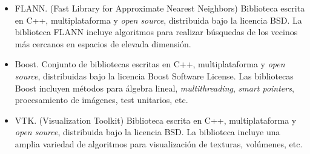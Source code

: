 \begin{itemize}
\item FLANN. (Fast Library for Approximate Nearest Neighbors) Biblioteca escrita en C++, multiplataforma y \textit{open source}, distribuida bajo la licencia BSD. La biblioteca FLANN incluye algoritmos para realizar búsquedas de los vecinos más cercanos en espacios de elevada dimensión.

\item Boost. Conjunto de bibliotecas escritas en C++, multiplataforma y \textit{open source}, distribuidas bajo la licencia Boost Software License. Las bibliotecas Boost incluyen métodos para álgebra lineal, \textit{multithreading}, \textit{smart pointers}, procesamiento de imágenes, test unitarios, etc.

\item VTK. (Visualization Toolkit) Biblioteca escrita en C++, multiplataforma y \textit{open source}, distribuida bajo la licencia BSD. La biblioteca incluye una amplia variedad de algoritmos para visualización de texturas, volúmenes, etc.

\end{itemize}

